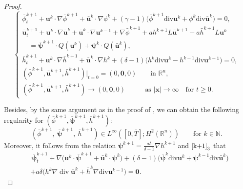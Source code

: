 \documentclass[10pt,a4paper]{amsart}
\DeclareMathOperator{\diver}{\mathrm{div}}
\begin{document}
\begin{proof}
\begin{equation}\label{k+3}
\begin{cases}
\displaystyle
\bar{\phi}^{k+1}_t+\boldsymbol{u}^k\cdot\nabla\bar{\phi}^{k+1}+\bar{\boldsymbol{u}}^k\cdot\nabla\phi^k+(\gamma-1)\big(\bar{\phi}^{k+1}\mathrm{div}\boldsymbol{u}^k+\phi^k\mathrm{div}\bar{\boldsymbol{u}}^k\big)=0,\\[4pt]
\displaystyle
\bar{\boldsymbol{u}}_t^{k+1}+\boldsymbol{u}^k\cdot\nabla \bar{\boldsymbol{u}}^k+\bar{\boldsymbol{u}}^k\cdot\nabla \boldsymbol{u}^{k-1}+\nabla\bar{\phi}^{k+1}
+ah^{k+1}L\bar{\boldsymbol{u}}^{k+1}+a\bar{h}^{k+1}L\boldsymbol{u}^{k}\\[2pt]
\displaystyle
\quad =\bar{\boldsymbol{\psi}}^{k+1}\cdot Q(\boldsymbol{u}^k)+\boldsymbol{\psi}^{k}\cdot Q(\bar{\boldsymbol{u}}^k),\\[2pt]
\displaystyle
\bar{h}^{k+1}_t+\boldsymbol{u}^k\cdot\nabla \bar{h}^{k+1}+\bar{\boldsymbol{u}}^k\cdot\nabla h^k+(\delta-1)\big(h^k\mathrm{div}{\boldsymbol{u}}^k-{h}^{k-1}\mathrm{div}\boldsymbol{u}^{k-1}\big)=0,\\[2pt]
\displaystyle
(\bar{\phi}^{k+1},\bar{\boldsymbol{u}}^{k+1},\bar{h}^{k+1})|_{t=0}=(0,\boldsymbol{0},0) \qquad\text{in $\mathbb{R}^n$},
\\[4pt]
\displaystyle
(\bar{\phi}^{k+1},\bar{\boldsymbol{u}}^{k+1},\bar{h}^{k+1})\to (0,\boldsymbol{0},0) \ \ \ \ \qquad\text{as $|\boldsymbol{x}|\to \infty$} \quad \text{for $t\geq 0$}.
\end{cases}
\end{equation}

Besides, by the same argument as in the proof of \cite[Lemma 3.11]{dxz}, we can obtain the following regularity for $(\bar{\phi}^{k+1},\bar{\boldsymbol{\psi}}^{k+1},\bar{h}^{k+1})$:
\begin{equation*} 
(\bar{\phi}^{k+1},\ \bar{\boldsymbol{\psi}}^{k+1}, \ \bar{h}^{k+1}) \in L^\infty([0,\bar{T}];H^2(\mathbb{R}^n)) \qquad \text{for $k\in \mathbb{N}$}.
\end{equation*}
Moreover, it follows from the relation $\boldsymbol{\psi}^{k+1}=\frac{a\delta}{\delta-1}\nabla h^{k+1}$ and $\eqref{k+1}_3$ that 
\begin{equation}\label{psibar1}
\begin{aligned}
&\,\bar{\boldsymbol{\psi}}^{k+1}_t+\nabla\big(\boldsymbol{u}^k\cdot \bar{\boldsymbol{\psi}}^{k+1}+\bar{\boldsymbol{u}}^k\cdot\boldsymbol{\psi}^k\big)+(\delta-1)\big(\bar{\boldsymbol{\psi}}^k\mathrm{div}\boldsymbol{u}^k+\boldsymbol{\psi}^{k-1}\mathrm{div}\bar{\boldsymbol{u}}^k\big)\\[2pt]
&+a\delta\big(h^k\nabla\diver \bar{\boldsymbol{u}}^k+\bar{h}^k\nabla\mathrm{div}\boldsymbol{u}^{k-1}\big)=\boldsymbol{0}.
\end{aligned}
\end{equation}


\end{proof}
\end{document}
